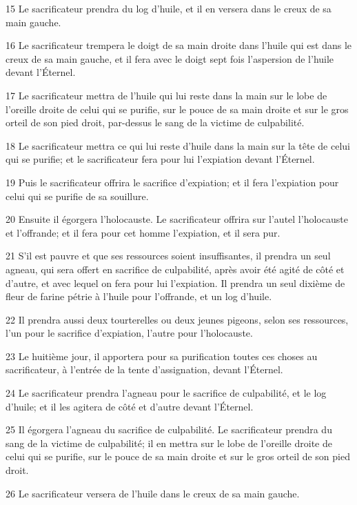 \par 15 Le sacrificateur prendra du log d'huile, et il en versera dans le creux de sa main gauche.
\par 16 Le sacrificateur trempera le doigt de sa main droite dans l'huile qui est dans le creux de sa main gauche, et il fera avec le doigt sept fois l'aspersion de l'huile devant l'Éternel.
\par 17 Le sacrificateur mettra de l'huile qui lui reste dans la main sur le lobe de l'oreille droite de celui qui se purifie, sur le pouce de sa main droite et sur le gros orteil de son pied droit, par-dessus le sang de la victime de culpabilité.
\par 18 Le sacrificateur mettra ce qui lui reste d'huile dans la main sur la tête de celui qui se purifie; et le sacrificateur fera pour lui l'expiation devant l'Éternel.
\par 19 Puis le sacrificateur offrira le sacrifice d'expiation; et il fera l'expiation pour celui qui se purifie de sa souillure.
\par 20 Ensuite il égorgera l'holocauste. Le sacrificateur offrira sur l'autel l'holocauste et l'offrande; et il fera pour cet homme l'expiation, et il sera pur.
\par 21 S'il est pauvre et que ses ressources soient insuffisantes, il prendra un seul agneau, qui sera offert en sacrifice de culpabilité, après avoir été agité de côté et d'autre, et avec lequel on fera pour lui l'expiation. Il prendra un seul dixième de fleur de farine pétrie à l'huile pour l'offrande, et un log d'huile.
\par 22 Il prendra aussi deux tourterelles ou deux jeunes pigeons, selon ses ressources, l'un pour le sacrifice d'expiation, l'autre pour l'holocauste.
\par 23 Le huitième jour, il apportera pour sa purification toutes ces choses au sacrificateur, à l'entrée de la tente d'assignation, devant l'Éternel.
\par 24 Le sacrificateur prendra l'agneau pour le sacrifice de culpabilité, et le log d'huile; et il les agitera de côté et d'autre devant l'Éternel.
\par 25 Il égorgera l'agneau du sacrifice de culpabilité. Le sacrificateur prendra du sang de la victime de culpabilité; il en mettra sur le lobe de l'oreille droite de celui qui se purifie, sur le pouce de sa main droite et sur le gros orteil de son pied droit.
\par 26 Le sacrificateur versera de l'huile dans le creux de sa main gauche.
